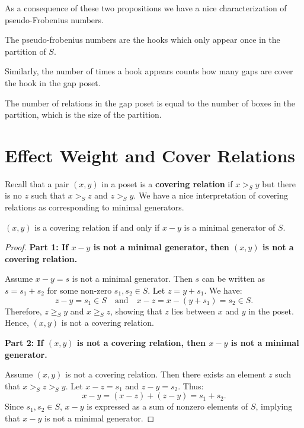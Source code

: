 As a consequence of these two propositions we have a nice characterization of pseudo-Frobenius numbers.

\begin{corollary}
    The pseudo-frobenius numbers are the hooks which only appear once in the partition of \(S\).
\end{corollary}

Similarly, the number of times a hook appears counts how many gaps are cover the hook in the gap poset.

\begin{corollary}
The number of relations in the gap poset is equal to the number of boxes in the partition, which is the size of the partition.
\end{corollary}

\iffalse
\begin{proof}
    Each relation in the gap poset corresponds to a box in the Ferrers diagram of the partition. Since every box represents a unique relation where a hook \( h \) can be determined from a gap \( f \) and a semigroup element \( s \), the total number of such relations is precisely the number of boxes in the partition.
\end{proof}
\fi

\newpage
\section{Effect Weight and Cover Relations}

Recall that a pair \((x, y)\) in a poset is a \textbf{covering relation} if \(x >_S y\) but there is no \(z\) such that \(x  >_S z\) and \(z >_S y\). We have a nice interpretation of covering relations as corresponding to minimal generators.

\begin{proposition}
    \((x, y)\) is a covering relation if and only if \(x - y\) is a minimal generator of \(S\).
\end{proposition}

\begin{proof}
    \textbf{Part 1: If \(x - y\) is not a minimal generator, then \((x, y)\) is not a covering relation.}

    Assume \(x - y = s\) is not a minimal generator. Then \(s\) can be written as \(s = s_1 + s_2\) for some non-zero \(s_1, s_2 \in S\). Let \(z = y + s_1\). We have:
    \[
    z - y = s_1 \in S \quad \text{and} \quad x - z = x - (y + s_1) = s_2 \in S.
    \]
    Therefore, \(z \ge_S y\) and \(x \ge_S z\), showing that \(z\) lies between \(x\) and \(y\) in the poset. Hence, \((x, y)\) is not a covering relation.

    \textbf{Part 2: If \((x, y)\) is not a covering relation, then \(x - y\) is not a minimal generator.}

    Assume \((x, y)\) is not a covering relation. Then there exists an element \(z\) such that \(x >_S z >_S y\). Let \(x - z = s_1\) and \(z - y = s_2\). Thus:
    \[
    x - y = (x - z) + (z - y) = s_1 + s_2.
    \]
    Since \(s_1, s_2 \in S\), \(x - y\) is expressed as a sum of nonzero elements of \(S\), implying that \(x - y\) is not a minimal generator.
\end{proof}

